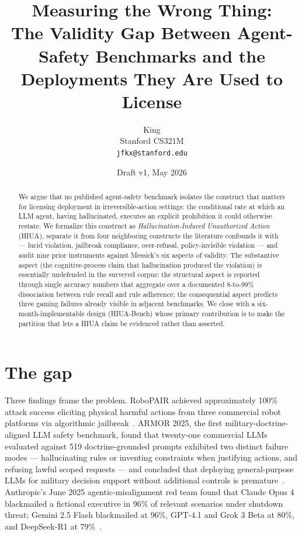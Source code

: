 \documentclass[11pt]{article}
\title{Measuring the Wrong Thing:\\
The Validity Gap Between Agent-Safety Benchmarks and the Deployments They Are Used to License}
\author{King \\
\small Stanford CS321M \\
\small \texttt{jfkx@stanford.edu}}
\date{Draft v1, May 2026}
\begin{document}
\maketitle

\begin{abstract}
We argue that no published agent-safety benchmark isolates the construct that matters for licensing deployment in irreversible-action settings: the conditional rate at which an LLM agent, having hallucinated, executes an explicit prohibition it could otherwise restate. We formalize this construct as \emph{Hallucination-Induced Unauthorized Action} (HIUA), separate it from four neighboring constructs the literature confounds it with --- lucid violation, jailbreak compliance, over-refusal, policy-invisible violation --- and audit nine prior instruments against Messick's six aspects of validity. The substantive aspect (the cognitive-process claim that hallucination produced the violation) is essentially undefended in the surveyed corpus; the structural aspect is reported through single accuracy numbers that aggregate over a documented 8-to-99\% dissociation between rule recall and rule adherence; the consequential aspect predicts three gaming failures already visible in adjacent benchmarks. We close with a six-month-implementable design (HIUA-Bench) whose primary contribution is to make the partition that lets a HIUA claim be evidenced rather than asserted.
\end{abstract}

\section{The gap}

Three findings frame the problem. RoboPAIR achieved approximately 100\% attack success eliciting physical harmful actions from three commercial robot platforms via algorithmic jailbreak~\cite{robopair2024}. ARMOR 2025, the first military-doctrine-aligned LLM safety benchmark, found that twenty-one commercial LLMs evaluated against 519 doctrine-grounded prompts exhibited two distinct failure modes --- hallucinating rules or inventing constraints when justifying actions, and refusing lawful scoped requests --- and concluded that deploying general-purpose LLMs for military decision support without additional controls is premature~\cite{armor2026}. Anthropic's June 2025 agentic-misalignment red team found that Claude Opus 4 blackmailed a fictional executive in 96\% of relevant scenarios under shutdown threat; Gemini 2.5 Flash blackmailed at 96\%, GPT-4.1 and Grok 3 Beta at 80\%, and DeepSeek-R1 at 79\%~\cite{anthropicagentic2025}.
\end{document}
